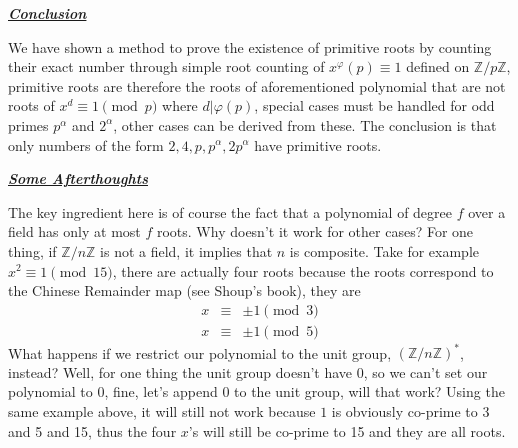 \documentclass[aps,preprint,preprintnumbers,nofootinbib,showpacs,prd]{revtex4-1}
\newcommand{\nbea}{\begin{eqnarray*}}
\newcommand{\neea}{\end{eqnarray*}}
\begin{document}
\bigskip
\underline{\textbf{\textit{Conclusion}}}
\bigskip

We have shown a method to prove the existence of primitive roots by counting their exact number through simple root counting of $x^\varphi(p) \equiv 1$ defined on $\mathbb{Z}/p\mathbb{Z}$, primitive roots are therefore the roots of aforementioned polynomial that are not roots of $x^d \equiv 1 \pmod{p}$ where $d|\varphi(p)$, special cases must be handled for odd primes $p^\alpha$ and $2^\alpha$, other cases can be derived from these. The conclusion is that only numbers of the form $2, 4, p, p^\alpha, 2p^\alpha$ have primitive roots.

\bigskip
\underline{\textbf{\textit{Some Afterthoughts}}}
\bigskip

The key ingredient here is of course the fact that a polynomial of degree $f$ over a field has only at most $f$ roots. Why doesn't it work for other cases? For one thing, if $\mathbb{Z}/n\mathbb{Z}$ is not a field, it implies that $n$ is composite. Take for example $x^2 \equiv 1 \pmod{15}$, there are actually four roots because the roots correspond to the Chinese Remainder map (see Shoup's book), they are
%
\nbea
x & \equiv & \pm 1 \pmod{3} \\
x & \equiv & \pm 1 \pmod{5} 
\neea
%
What happens if we restrict our polynomial to the unit group, $(\mathbb{Z}/n\mathbb{Z})^*$, instead? Well, for one thing the unit group doesn't have 0, so we can't set our polynomial to 0, fine, let's append 0 to the unit group, will that work? Using the same example above, it will still not work because $1$ is obviously co-prime to 3 and 5 and 15, thus the four $x$'s will still be co-prime to 15 and they are all roots.
\end{document}
